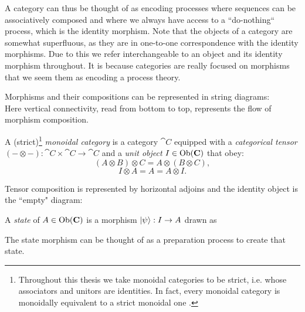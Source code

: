 A category can thus be thought of as encoding processes where sequences can be associatively composed  and where we always have access to a ``do-nothing`` process, which is the identity morphism. Note that the objects of a category are somewhat superfluous, as they are in one-to-one correspondence with the identity morphisms. Due to this we refer interchangeable to an object and its identity morphism throughout. It is because categories are really focused on morphisms that we seem them as encoding a process theory.

Morphisms and their compositions can be represented in string diagrams:
\begin{equation}
\label{eq:composition}

\end{equation}
\noindent Here vertical connectivity, read from bottom to top, represents the flow of morphism composition.

\begin{defn}
A (strict)\footnote{Throughout this thesis we take monoidal categories to be strict, i.e. whose associators and unitors are identities.  In fact, every monoidal category is monoidally equivalent to a strict monoidal one \cite{joyal1993braided}.} \emph{monoidal category} is a category $\cat{C}$ equipped with a \emph{categorical tensor} $(-\otimes-):\cat{C}\times\cat{C}\to\cat{C}$ and a \emph{unit object} $I\in\mbox{Ob}(\mathbf{C})$ that obey:
\begin{equation}
(A\otimes B)\otimes C = A\otimes(B\otimes C),
\end{equation}
\begin{equation}
I\otimes A = A = A\otimes I.
\end{equation}
\end{defn}

Tensor composition is represented by horizontal adjoins and the identity object is the ``empty" diagram:
\begin{equation}
\label{eq:tensor}

\end{equation}

\begin{defn}
\label{defn:state}
A \emph{state} of $A\in\mbox{Ob}(\mathbf{C})$ is a morphism $| \psi \rangle:I\to A$ drawn as
\begin{equation}
\label{eq:state}

\end{equation}
\end{defn}

\noindent The state morphism can be thought of as a preparation process to create that state.

